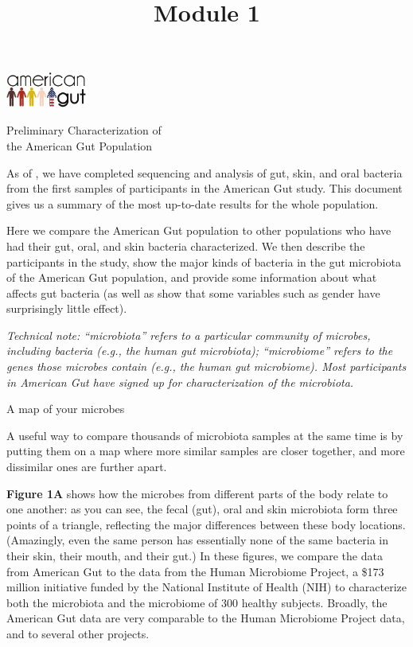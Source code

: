 \documentclass[10pt,letterpaper]{article}
\title{Module 1}
\begin{document}
\parbox{4.5cm}{
	\includegraphics[width=0.2\textwidth]{pdfs-mod1/logoshape.pdf}
}
\parbox{14cm}{
	\fontsize{20pt}{24pt}\selectfont
	Preliminary Characterization of \\ the American Gut Population
}

\vspace{0.5cm}

As of \releaseDate{}, we have completed sequencing and analysis of gut, skin, and oral bacteria from the first \numSamples{} samples of \numParticipants{} participants in the American Gut study.  This document gives us a summary of the most up-to-date results for the whole population. 

Here we compare the American Gut population to other populations who have had their gut, oral, and skin bacteria characterized.  We then describe the participants in the study, show the major kinds of bacteria in the gut microbiota of the American Gut population, and provide some information about what affects gut bacteria (as well as show that some variables such as gender have surprisingly little effect).

{\em Technical note: ``microbiota'' refers to a particular community of microbes, including bacteria (e.g., the human gut microbiota); ``microbiome'' refers to the genes those microbes contain (e.g., the human gut microbiome). Most participants in American Gut have signed up for characterization of the microbiota.}

\colorbox{agpFlesh}{\parbox{\textwidth}{\vspace{1mm} \LARGE \centering A map of your microbes \vspace{1mm}}}

A useful way to compare thousands of microbiota samples at the same time is by putting them on a map where more similar samples are closer together, and more dissimilar ones are further apart.

{\bf Figure 1A} shows how the microbes from different parts of the body relate to one another: as you can see, the fecal (gut), oral and skin microbiota form three points of a triangle, reflecting the major differences between these body locations. (Amazingly, even the same person has essentially none of the same bacteria in their skin, their mouth, and their gut.) In these figures, we compare the data from American Gut to the data from the Human Microbiome Project, a \$173 million initiative funded by the National Institute of Health (NIH) to characterize both the microbiota and the microbiome of 300 healthy subjects. Broadly, the American Gut data are very comparable to the Human Microbiome Project data, and to several other projects.
\end{document}
